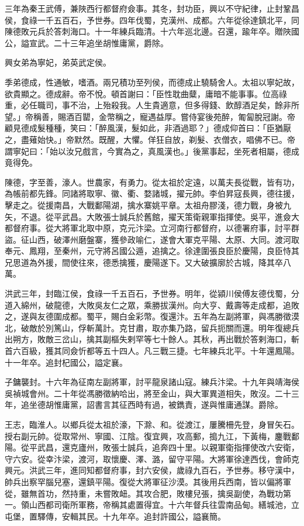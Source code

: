 \begin{pinyinscope}
三年為秦王武傅，兼陜西行都督府僉事。其冬，封功臣，興以不守紀律，止封鞏昌侯，食祿一千五百石，予世券。四年伐蜀，克漢州、成都。六年從徐達鎮北平，同陳德敗元兵於答刺海口。十一年練兵臨清。十六年巡北邊。召還，踰年卒。贈陜國公，謚宣武。二十三年追坐胡惟庸黨，爵除。

興女弟為寧妃，弟英武定侯。

季弟德成，性通敏，嗜酒。兩兄積功至列侯，而德成止驍騎舍人。太祖以寧妃故，欲貴顯之。德成辭。帝不悅。頓首謝曰：「臣性耽曲糵，庸暗不能事事。位高祿重，必任職司，事不治，上殆殺我。人生貴適意，但多得錢、飲醇酒足矣，餘非所望。」帝稱善，賜酒百罌，金幣稱之，寵遇益厚。嘗侍宴後苑醉，匍匐脫冠謝。帝顧見德成髮種種，笑曰：「醉風漢，髮如此，非酒過耶？」德成仰首曰：「臣猶厭之，盡薙始快。」帝默然。既醒，大懼。佯狂自放，剃髮、衣僧衣，唱佛不已。帝謂寧妃曰：「始以汝兄戲言，今實為之，真風漢也。」後黨事起，坐死者相屬，德成竟得免。

陳德，字至善，濠人。世農家，有勇力。從太祖於定遠，以萬夫長從戰，皆有功，為帳前都先鋒。同諸將取寧、徽、衢、婺諸城，擢元帥。李伯昇寇長興，德往援，擊走之。從援南昌，大戰鄱陽湖，擒水寨姚平章。太祖舟膠淺，德力戰，身被九矢，不退。從平武昌。大敗張士誠兵於舊館，擢天策衛親軍指揮使。吳平，進僉大都督府事。從大將軍北取中原，克元汴梁。立河南行都督府，以德署府事，討平群盜。征山西，破澤州磨盤寨，獲參政喻仁，遂會大軍克平陽、太原、大同。渡河取奉元、鳳翔，至秦州，元守將呂國公遁，追擒之。徐達圍張良臣於慶陽，良臣恃其兄思道為外援，間使往來，德悉擒獲，慶陽遂下。又大破擴廓於古城，降其卒八萬。

洪武三年，封臨江侯，食祿一千五百石，予世券。明年，從潁川侯傅友德伐蜀，分道入綿州，破龍德，大敗吳友仁之眾，乘勝拔漢州。向大亨、戴壽等走成都，追敗之，遂與友德圍成都。蜀平，賜白金彩幣。復還汴。五年為左副將軍，與馮勝徵漠北，破敵於別篤山，俘斬萬計。克甘肅，取亦集乃路，留兵扼關而還。明年復總兵出朔方，敗敵三岔山，擒其副樞失剌罕等七十餘人。其秋，再出戰於答剌海口，斬首六百級，獲其同僉忻都等五十四人。凡三戰三捷。七年練兵北平。十年還鳳陽。十一年卒。追封杞國公，謚定襄。

子鏞襲封。十六年為征南左副將軍，討平龍泉諸山寇。練兵汴梁。十九年與靖海侯吳禎城會州。二十年從馮勝徵納哈出，將至金山，與大軍異道相失，敗沒。二十三年，追坐德胡惟庸黨，詔書言其征西時有過，被鐫責，遂與惟庸通謀。爵除。

王志，臨淮人。以鄉兵從太祖於濠，下滁、和。從渡江，屢騰柵先登，身冒矢石。授右副元帥。從取常州、寧國、江陰。復宜興，攻高郵，搗九江，下黃梅，鏖戰鄱陽。從平武昌，還克廬州，敗張士誠兵，追奔四十里。以親軍衛指揮使改六安衛，守六安。從幸汴梁，渡河，取懷慶、澤、潞，留守平陽。大將軍徐達西伐，會師克興元。洪武三年，進同知都督府事，封六安侯，歲祿九百石，予世券。移守漢中，帥兵出察罕腦兒塞，還鎮平陽。復從大將軍征沙漠。其後用兵西南，皆以偏將軍從，雖無首功，然持重，未嘗敗衄。其攻合肥，敗樓兒張，擒吳副使，為戰功第一。領山西都司衛所軍務，帝稱其處置得宜。十六年督兵往雲南品甸。繕城池，立屯堡，置驛傳，安輯其民。十九年卒。追封許國公，謚襄簡。


\end{pinyinscope}
